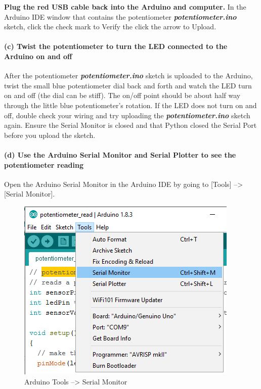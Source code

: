 \documentclass[11pt]{article}
\begin{document}
\textbf{Plug the red USB cable back into the Arduino and computer.} In
the Arduino IDE window that contains the potentiometer
\textbf{\emph{potentiometer.ino}} sketch, click the check mark to Verify
the click the arrow to Upload.

    \hypertarget{c-twist-the-potentiometer-to-turn-the-led-connected-to-the-arduino-on-and-off}{%
\paragraph{(c) Twist the potentiometer to turn the LED connected to the
Arduino on and
off}\label{c-twist-the-potentiometer-to-turn-the-led-connected-to-the-arduino-on-and-off}}

After the potentiometer \textbf{\emph{potentiometer.ino}} sketch is
uploaded to the Arduino, twist the small blue potentiometer dial back
and forth and watch the LED turn on and off (the dial can be stiff). The
on/off point should be about half way through the little blue
potentiometer's rotation. If the LED does not turn on and off, double
check your wiring and try uploading the
\textbf{\emph{potentiometer.ino}} sketch again. Ensure the Serial
Monitor is closed and that Python closed the Serial Port before you
upload the sketch.

    \hypertarget{d-use-the-arduino-serial-monitor-and-serial-plotter-to-see-the-potentiometer-reading}{%
\paragraph{(d) Use the Arduino Serial Monitor and Serial Plotter to see
the potentiometer
reading}\label{d-use-the-arduino-serial-monitor-and-serial-plotter-to-see-the-potentiometer-reading}}

Open the Arduino Serial Monitor in the Arduino IDE by going to
{[}Tools{]} --\textgreater{} {[}Serial Monitor{]}.

\begin{figure}
\centering
\includegraphics{images/Tools_SerialMonitor.png}
\caption{Arduino Tools --\textgreater{} Serial Monitor}
\end{figure}
\end{document}
